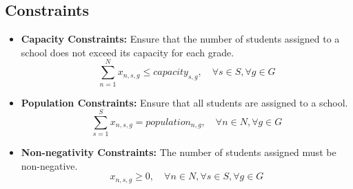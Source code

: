 \documentclass{article}
\begin{document}
\subsection*{Constraints}
\begin{itemize}
    \item \textbf{Capacity Constraints:} Ensure that the number of students assigned to a school does not exceed its capacity for each grade.
    \[
    \sum_{n=1}^{N} x_{n,s,g} \leq capacity_{s,g}, \quad \forall s \in S, \forall g \in G
    \]
    \item \textbf{Population Constraints:} Ensure that all students are assigned to a school.
    \[
    \sum_{s=1}^{S} x_{n,s,g} = population_{n,g}, \quad \forall n \in N, \forall g \in G
    \]
    \item \textbf{Non-negativity Constraints:} The number of students assigned must be non-negative.
    \[
    x_{n,s,g} \geq 0, \quad \forall n \in N, \forall s \in S, \forall g \in G
    \]
\end{itemize}
\end{document}

